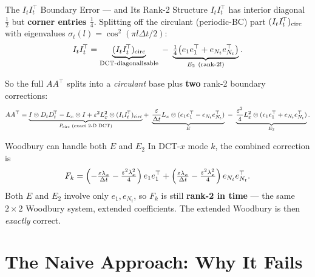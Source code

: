 \documentclass[10pt,aspectratio=169]{beamer}
\newcommand{\eps}{\varepsilon}
\newcommand{\lx}{\lambda_x}
\newcommand{\Dt}{D_t}
\newcommand{\DtT}{D_t^{\!\top}}
\newcommand{\It}{I_t}
\newcommand{\ItT}{I_t^{\!\top}}
\newcommand{\Lx}{L_x}
\newcommand{\kron}{\otimes}
\begin{document}
\begin{frame}{The $\It\ItT$ Boundary Error — and Its Rank-2 Structure}
  $\It\ItT$ has interior diagonal $\tfrac{1}{2}$ but \textbf{corner entries $\tfrac{1}{4}$}.
  Splitting off the circulant (periodic-BC) part $(\It\ItT)_{\rm circ}$ with
  eigenvalues $\sigma_t(l)=\cos^2(\pi l\Delta t/2)$:
  \[
    \It\ItT
    = \underbrace{(\It\ItT)_{\rm circ}}_{\text{DCT-diagonalisable}}
      \;-\;
      \underbrace{\tfrac{1}{4}\bigl(e_1 e_1^\top + e_{N_t}e_{N_t}^\top\bigr)}_{E_2\ (\text{rank-2!})}.
  \]

  \smallskip
  So the full $AA^\top$ splits into a \emph{circulant} base plus
  \textbf{two} rank-2 boundary corrections:
  \[
    AA^\top
    = \underbrace{I\kron\Dt\DtT - \Lx\kron I
        + \eps^2\Lx^2\kron(\It\ItT)_{\rm circ}}_{P_{\rm circ}\text{ (exact 2-D DCT)}}
    +\;
    \underbrace{\frac{\eps}{\Delta t}\Lx\kron(e_1 e_1^\top - e_{N_t}e_{N_t}^\top)}_{E}
    \;-\;
    \underbrace{\frac{\eps^2}{4}\Lx^2\kron(e_1 e_1^\top + e_{N_t}e_{N_t}^\top)}_{E_2}.
  \]

  \begin{block}{Woodbury can handle both $E$ and $E_2$}
    In DCT-$x$ mode $k$, the combined correction is
    \[
      F_k = \Bigl(-\tfrac{\eps\lx}{\Delta t} - \tfrac{\eps^2\lx^2}{4}\Bigr)\,e_1 e_1^\top
            + \Bigl(\tfrac{\eps\lx}{\Delta t} - \tfrac{\eps^2\lx^2}{4}\Bigr)\,e_{N_t}e_{N_t}^\top.
    \]
    Both $E$ and $E_2$ involve only $e_1,e_{N_t}$, so $F_k$ is still
    \textbf{rank-2 in time} — the same $2{\times}2$ Woodbury system, extended
    coefficients. The extended Woodbury is then \emph{exactly} correct.
  \end{block}
\end{frame}

\section{The Naive Approach: Why It Fails}
\end{document}
